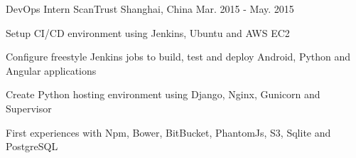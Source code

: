 \begin{cventries}
  \cventry
    {DevOps Intern} %
    {ScanTrust} %
    {Shanghai, China} %
    {Mar. 2015 - May. 2015} %
    {
      \begin{cvitems} %
        \item {Setup CI/CD environment using Jenkins, Ubuntu and AWS EC2}
        \item {Configure freestyle Jenkins jobs to build, test and deploy Android, Python and Angular applications}
        \item {Create Python hosting environment using Django, Nginx, Gunicorn and Supervisor}        
        \item {First experiences with Npm, Bower, BitBucket, PhantomJs, S3, Sqlite and PostgreSQL}
      \end{cvitems}
    }

\end{cventries}